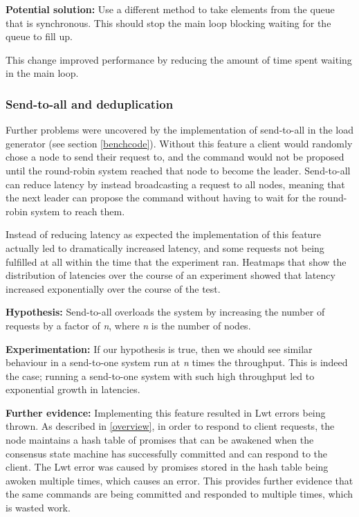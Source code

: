 \textbf{Potential solution: } Use a different method to take elements from the queue that is synchronous. This should stop the main loop blocking waiting for the queue to fill up.

This change improved performance by reducing the amount of time spent waiting in the main loop.

\subsubsection{Send-to-all and deduplication} \label{sendtoall}
Further problems were uncovered by the implementation of send-to-all in the load generator (see section \ref{benchcode}). Without this feature a client would randomly chose a node to send their request to, and the command would not be proposed until the round-robin system reached that node to become the leader. Send-to-all can reduce latency by instead broadcasting a request to all nodes, meaning that the next leader can propose the command without having to wait for the round-robin system to reach them.

Instead of reducing latency as expected the implementation of this feature actually led to dramatically increased latency, and some requests not being fulfilled at all within the time that the experiment ran. Heatmaps that show the distribution of latencies over the course of an experiment showed that latency increased exponentially over the course of the test.

\textbf{Hypothesis: } Send-to-all overloads the system by increasing the number of requests by a factor of \textit{n}, where \textit{n} is the number of nodes.

\textbf{Experimentation: } If our hypothesis is true, then we should see similar behaviour in a send-to-one system run at \textit{n} times the throughput. This is indeed the case; running a send-to-one system with such high throughput led to exponential growth in latencies.

\textbf{Further evidence: } Implementing this feature resulted in Lwt errors being thrown. As described in \ref{overview}, in order to respond to client requests, the node maintains a hash table of promises that can be awakened when the consensus state machine has successfully committed and can respond to the client. The Lwt error was caused by promises stored in the hash table being awoken multiple times, which causes an error. This provides further evidence that the same commands are being committed and responded to multiple times, which is wasted work.

